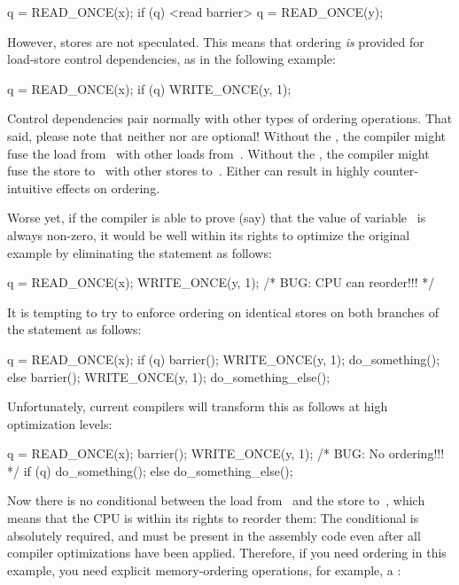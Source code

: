 \begin{VerbatimN}
q = READ_ONCE(x);
if (q) {
	<read barrier>
	q = READ_ONCE(y);
}
\end{VerbatimN}

However, stores are not speculated.
This means that ordering \emph{is} provided for load-store control
dependencies, as in the following example:

\begin{VerbatimN}
q = READ_ONCE(x);
if (q)
	WRITE_ONCE(y, 1);
\end{VerbatimN}

Control dependencies pair normally with other types of ordering operations.
That said, please note that neither  nor 
are optional!
Without the , the compiler might fuse the load
from~ with other loads from~.
Without the , the compiler might fuse the store
to~ with other stores to~.
Either can result in highly counter-intuitive effects on ordering.

Worse yet, if the compiler is able to prove (say) that the value of
variable~ is always non-zero, it would be well within its rights
to optimize the original example by eliminating the  statement
as follows:

\begin{VerbatimN}
q = READ_ONCE(x);
WRITE_ONCE(y, 1); /* BUG: CPU can reorder!!! */
\end{VerbatimN}

It is tempting to try to enforce ordering on identical stores on both
branches of the  statement as follows:

\begin{VerbatimN}
q = READ_ONCE(x);
if (q) {
	barrier();
	WRITE_ONCE(y, 1);
	do_something();
} else {
	barrier();
	WRITE_ONCE(y, 1);
	do_something_else();
}
\end{VerbatimN}

Unfortunately, current compilers will transform this as follows at high
optimization levels:

\begin{VerbatimN}
q = READ_ONCE(x);
barrier();
WRITE_ONCE(y, 1);  /* BUG: No ordering!!! */
if (q) {
	do_something();
} else {
	do_something_else();
}
\end{VerbatimN}

Now there is no conditional between the load from~ and the store
to~, which means that the CPU is within its rights to reorder them:
The conditional is absolutely required, and must be present in the
assembly code even after all compiler optimizations have been applied.
Therefore, if you need ordering in this example, you need explicit
memory-ordering operations, for example, a :

